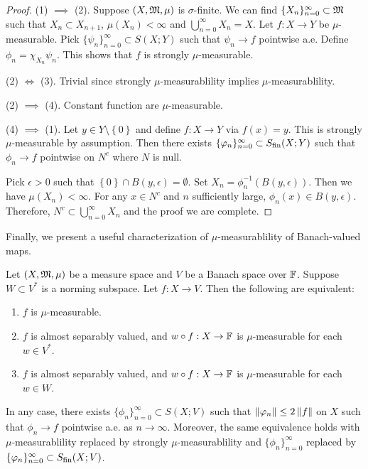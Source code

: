 \documentclass[a4paper]{article}
\renewcommand{\cupinfn}{\bigcup_{n=0}^\infty}
\renewcommand{\seqinfn}[1]{\{ #1 \}_{n=0}^\infty}
\begin{document}
\begin{proof}
  (1) $\implies$ (2). Suppose $(X, \mathfrak{M}, \mu)$ is
  $\sigma$-finite. We can find $\seqinfn{X_n}
  \subset \mf$ such that $X_n \subset X_{n+1}$,
  $\mu(X_n) < \infty$ and $\cupinfn X_n = X$.
  Let $f: X \to Y$ be $\mu$-measurable. Pick
  $\seqinfn{\psi_n} \subset S(X; Y)$ such that
  $\psi_n \to f$ pointwise a.e. Define
  $\phi_n = \chi_{X_n} \psi_n$. This shows that
  $f$ is strongly $\mu$-measurable.

  (2) $\iff$ (3). Trivial since strongly $\mu$-measurablility
  implies $\mu$-measurablility.

  (2) $\implies$ (4). Constant function are $\mu$-measurable.

  (4) $\implies$ (1). Let $y \in Y \setminus \left\{ 0 \right\}$
  and define $f : X \to Y$ via $f(x) = y$. This
  is strongly $\mu$-measurable by assumption.
  Then there exists $\seqinfn{\phi_n} \subset \Sfin(X; Y)$
  such that $\phi_n \to f$ pointwise on $N^c$ where
  $N$ is null.

  Pick $\epsilon > 0$ such that $\left\{ 0 \right\}
  \cap B(y, \epsilon) = \emptyset$. Set
  $X_n = \phi_n^{-1} (B(y, \epsilon))$. Then we have
  $\mu(X_n) < \infty$. For any $x \in N^c$ and $n$
  sufficiently large, $\phi_n(x) \in B(y, \epsilon)$.
  Therefore, $N^c \subset \cupinfn X_n$ and
  the proof we are complete.

\end{proof}

Finally, we present a useful characterization of
$\mu$-measurablility of Banach-valued maps.

\begin{thm}[Pettis]
  Let $(X, \mathfrak{M}, \mu)$ be a measure space and $V$ be a
  Banach space over $\mathbb{F}$. Suppose $W \subset V^*$ is a
  norming subspace. Let $f: X \to V$. Then the following
  are equivalent:
  \begin{enumerate}
    \item $f$ is $\mu$-measurable.
    \item $f$ is almost separably valued, and $w \circ
    f : X \to \mathbb{F}$ is $\mu$-measurable for each $w \in V^*$.
    \item $f$ is almost separably valued, and $w \circ f:
    X \to \mathbb{F}$ is $\mu$-measurable for each $w \in W$.
  \end{enumerate}
  In any case, there exists $\seqinfn{\phi_n} \subset S(X; V)
  $ such that $\left\lVert \varphi_n\right\rVert \leq 2 \left\lVert f\right\rVert$ on $X$ such that
  $\phi_n \to f$ pointwise a.e. as $n \to \infty$.
  Moreover, the same
  equivalence holds with $\mu$-measurablility replaced by
  strongly $\mu$-measurablility and $\seqinfn{\phi_n}$
  replaced by $\seqinfn{\phi_n} \subset \Sfin(X; V)$.
\end{thm}
\end{document}

